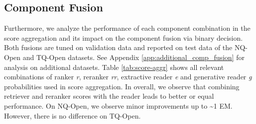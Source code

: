 \documentclass[11pt]{article}
\begin{document}
\begin{table}[t]
    \centering
    \caption{Results for binary decision on NQ-Open and TQ-Open for different aggregated pipeline components from Table \ref{tab:score-aggr}.}
    \label{tab:binary-decision}
\end{table}



\subsection{Component Fusion}
\label{sec:component_fusion}
Furthermore, we analyze the performance of each component combination in the score aggregation and its impact on the component fusion via binary decision.
Both fusions are tuned on validation data and reported on test data of the NQ-Open and TQ-Open datasets. See Appendix \ref{app:additional_comp_fusion} for analysis on additional datasets.
Table \ref{tab:score-aggr} shows all relevant combinations of ranker \emph{r}, reranker \emph{rr}, extractive reader \emph{e} and generative reader \emph{g} probabilities used in score aggregation. 
In overall, we observe that combining retriever and reranker scores with the reader leads to better or equal performance. On NQ-Open, we observe minor improvements up to \textasciitilde1 EM. However, there is no difference on TQ-Open. 
\end{document}
